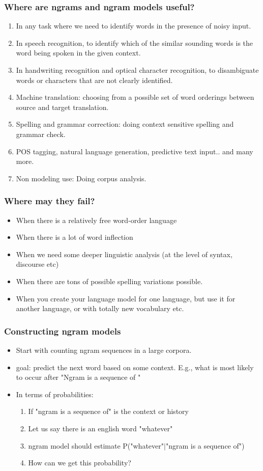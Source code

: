\documentclass{beamer}
\begin{document}
\begin{frame}
\frametitle{Where are ngrams and ngram models useful?}
\begin{enumerate}
\item In any task where we need to identify words in the presence of noisy input.
\item In speech recognition, to identify which of the similar sounding words is the word being spoken in the given context.
\item In handwriting recognition and optical character recognition, to disambiguate words or characters that are not clearly identified.
\item Machine translation: choosing from a possible set of word orderings between source and target translation.
\item Spelling and grammar correction: doing context sensitive spelling and grammar check.
\item POS tagging, natural language generation, predictive text input.. and many more.
\item Non modeling use: Doing corpus analysis.
\end{enumerate}
\end{frame}

\begin{frame}
\frametitle{Where may they fail?}
\begin{itemize}
\item When there is a relatively free word-order language
\item When there is a lot of word inflection
\item When we need some deeper linguistic analysis (at the level of syntax, discourse etc)
\item When there are tons of possible spelling variations possible.
\item When you create your language model for one language, but use it for another language, or with totally new vocabulary etc.
\end{itemize}
\end{frame}

\begin{frame}
\frametitle{Constructing ngram models}
\begin{itemize}
\item Start with counting ngram sequences in a large corpora.
\item goal: predict the next word based on some context. E.g., what is most likely to occur after "Ngram is a sequence of "
\item In terms of probabilities:
\begin{enumerate}
\item If "ngram is a sequence of" is the context or history
\item Let us say there is an english word "whatever"
\item ngram model should estimate P("whatever"$|$"ngram is a sequence of")
\item How can we get this probability? 
\end{enumerate}
\end{itemize}
\end{frame}
\end{document}
